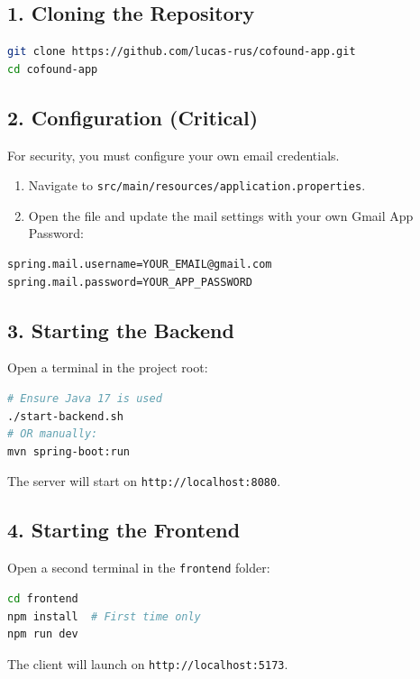 \documentclass[12pt,a4paper]{article}
\begin{document}
\subsection{1. Cloning the Repository}
\begin{lstlisting}[language=bash]
git clone https://github.com/lucas-rus/cofound-app.git
cd cofound-app
\end{lstlisting}

\subsection{2. Configuration (Critical)}
For security, you must configure your own email credentials.
\begin{enumerate}
    \item Navigate to \texttt{src/main/resources/application.properties}.
    \item Open the file and update the mail settings with your own Gmail App Password:
\end{enumerate}
\begin{lstlisting}[language=bash]
spring.mail.username=YOUR_EMAIL@gmail.com
spring.mail.password=YOUR_APP_PASSWORD
\end{lstlisting}

\subsection{3. Starting the Backend}
Open a terminal in the project root:
\begin{lstlisting}[language=bash]
# Ensure Java 17 is used
./start-backend.sh
# OR manually:
mvn spring-boot:run
\end{lstlisting}
The server will start on \texttt{http://localhost:8080}.

\subsection{4. Starting the Frontend}
Open a second terminal in the \texttt{frontend} folder:
\begin{lstlisting}[language=bash]
cd frontend
npm install  # First time only
npm run dev
\end{lstlisting}
The client will launch on \texttt{http://localhost:5173}.
\end{document}
